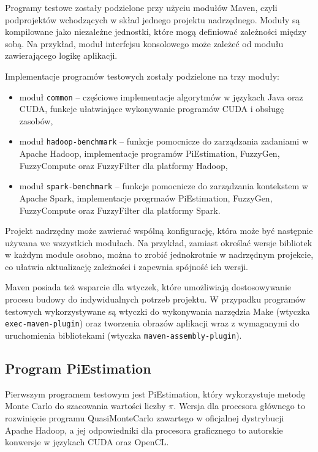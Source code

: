 Programy testowe zostały podzielone przy użyciu modułów Maven, czyli podprojektów wchodzących
w skład jednego projektu nadrzędnego. Moduły są kompilowane jako niezależne jednostki,
które mogą definiować zależności między sobą. Na przykład, moduł interfejsu konsolowego może
zależeć od modułu zawierającego logikę aplikacji.

Implementacje programów testowych zostały podzielone na trzy moduły:
\begin{itemize}
	\item moduł \lstinline{common} -- częściowe implementacje algorytmów w językach
	      Java oraz CUDA, funkcje ułatwiające wykonywanie programów CUDA i obsługę zasobów,
	\item moduł \lstinline{hadoop-benchmark} -- funkcje pomocnicze do zarządzania zadaniami w Apache Hadoop,
	      implementacje programów PiEstimation, FuzzyGen, FuzzyCompute oraz FuzzyFilter dla platformy Hadoop,
	\item moduł \lstinline{spark-benchmark} -- funkcje pomocnicze do zarządzania kontekstem w Apache Spark,
	      implementacje progrmaów PiEstimation, FuzzyGen, FuzzyCompute oraz FuzzyFilter dla platformy Spark.
\end{itemize}

Projekt nadrzędny może zawierać wspólną konfigurację, która może być następnie używana we
wszystkich modułach. Na przykład, zamiast określać wersje bibliotek w każdym module
osobno, można to zrobić jednokrotnie w nadrzędnym projekcie, co ułatwia aktualizację
zależności i zapewnia spójność ich wersji.

Maven posiada też wsparcie dla wtyczek, które umożliwiają dostosowywanie procesu budowy do
indywidualnych potrzeb projektu. W przypadku programów testowych wykorzystywane są wtyczki do
wykonywania narzędzia Make (wtyczka \lstinline{exec-maven-plugin}) oraz tworzenia obrazów aplikacji
wraz z wymaganymi do uruchomienia bibliotekami (wtyczka \lstinline{maven-assembly-plugin}).

\subsection{Program PiEstimation}

Pierwszym programem testowym jest PiEstimation, który wykorzystuje metodę Monte Carlo do szacowania
wartości liczby $\pi$. Wersja dla procesora głównego to rozwinięcie programu QuasiMonteCarlo
zawartego w oficjalnej dystrybucji Apache Hadoop, a jej odpowiedniki dla procesora graficznego
to autorskie konwersje w językach CUDA oraz OpenCL.

